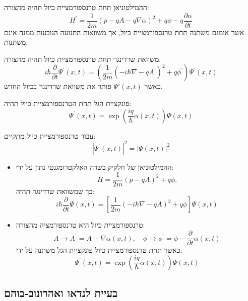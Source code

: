 \documentclass{tstextbook}
\begin{document}
\begin{proposition}
ההמילטוניאן תחת טרנספורמציית כיול תהיה מהצורה:
$$H^{\prime}=\frac{1}{2m}\left(p-q A-q\nabla\alpha\right)^{2}+q\phi-q\frac{\partial\alpha}{\partial t}$$
אשר אומנם משתנה תחת טרנספורמציית כיול, אך משוואות התנועה הנובעות ממנה אינם משתנות.

\end{proposition}
\begin{corollary}
משוואת שרדינגר תחת טרנספורמציית כיול תהיה מהצורה:
$$i\hbar{\frac{\partial}{\partial t}}\Psi^{\prime}(x,t)=\left({\frac{1}{2m}}\left(-i\hbar\nabla-q A^{\prime}\right)^{2}+q\phi^{\prime}\right)\Psi^{\prime}(x,t)$$
כאשר \(\Psi'(x,t)\) פותר את משוואת שרדינגר בכיול החדש.

\end{corollary}
\begin{corollary}
פונקציית הגל תחת הטרנספורמציית כיול תהיה:
$$\Psi^{\prime}(x,t)=\exp\left(\frac{i q}{\hbar}\alpha(x,t)\right)\Psi(x,t)$$

\end{corollary}
\begin{corollary}
עבור טרנספורמציית כיול מתקיים:
$$|\Psi^{\prime}(x,t)|^{2}=|\Psi(x,t)|^{2}$$

\end{corollary}
\begin{summary}
  \begin{itemize}
    \item ההמילטוניאן של חלקיק בשדה האלקטרומגנטי נתון על ידי:
$$H={\frac{1}{2m}}(p-q A)^{2}+q\phi.$$
כך שמשוואת שרדינגר תהיה:
$$i\hbar{\frac{\partial}{\partial t}}\Psi(x,t)=\left[{\frac{1}{2m}}\left(-i\hbar\nabla-q A\right)^{2}+q\phi\right]\Psi(x,t)$$
    \item טרנספורמציית כיול היא טרנספורמציה מהצורה:
$$A\to A^{\prime}=A+\nabla\alpha(x,t),\quad\phi\to\phi^{\prime}=\phi-\frac{\partial}{\partial t}\alpha(x,t)$$
כאשר תחת טרנספורמציית כיול פונקציית הגל משתנה על ידי:
$$\Psi^{\prime}(x,t)=\exp\left({\frac{i q}{\hbar}}\alpha(x,t)\right)\Psi(x,t)$$
  \end{itemize}
\end{summary}
\subsection{בעיית לנדאו ואהרונוב-בוהם}
\end{document}
